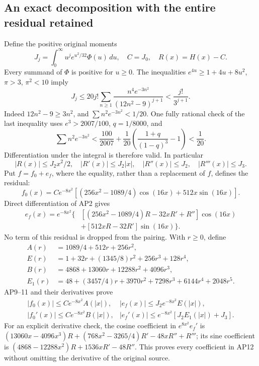 \subsection{An exact decomposition with the entire residual retained}
Define the positive original moments
\[
 J_j=\int_0^\infty u^j e^{u^2/32}\Phi(u)\,du,
 \quad C=J_0,\quad R(x)=H(x)-C.
 \tag{AP7}
\]
Every summand of \(\Phi\) is positive for \(u\ge0\).
The inequalities \(e^{4u}\ge1+4u+8u^2\), \(\pi>3\),
\(\pi^2<10\) imply
\[
 J_j\le20j!\sum_{n\ge1}\frac{n^4e^{-3n^2}}{(12n^2-9)^{j+1}}
 <\frac{j!}{3^{j+1}}.\tag{AP8}
\]
Indeed \(12n^2-9\ge3n^2\), and
\(\sum n^2e^{-3n^2}<1/20\). One fully rational check of the last
inequality uses \(e^3>2007/100\), \(q=1/8000\), and
\[
 \sum n^2e^{-3n^2}<\frac{100}{2007}
 +\frac1{20}\left(\frac{1+q}{(1-q)^3}-1\right)<\frac1{20}.
\]
Differentiation under the integral is therefore valid. In particular
\[
 |R(x)|\le J_2x^2/2,\quad |R'(x)|\le J_2|x|,
 \quad |R''(x)|\le J_2,\quad |R'''(x)|\le J_3.
 \tag{AP9}
\]
Put \(f=f_0+e_f\), where the equality, rather than a replacement
of \(f\), defines the residual:
\[
 f_0(x)=Ce^{-8x^2}[(256x^2-1089/4)\cos(16x)+512x\sin(16x)].
 \tag{AP10}
\]
Direct differentiation of AP2 gives
\[
\begin{split}
 e_f(x)=e^{-8x^2}\{&[(256x^2-1089/4)R-32xR'+R'']\cos(16x)\\
 &+[512xR-32R']\sin(16x)\}.
\end{split}\tag{AP11}
\]
No term of this residual is dropped from the pairing. With \(r\ge0\),
define
\[
\begin{split}
 A(r)&=1089/4+512r+256r^2,\\
 E(r)&=1+32r+(1345/8)r^2+256r^3+128r^4,\\
 B(r)&=4868+13060r+12288r^2+4096r^3,\\
 E_1(r)&=48+(3457/4)r+3970r^2+7298r^3+6144r^4+2048r^5.
\end{split}\tag{AP12}
\]
AP9--11 and their derivatives prove
\[
\begin{array}{ll}
 |f_0(x)|\le Ce^{-8x^2}A(|x|),&
 |e_f(x)|\le J_2e^{-8x^2}E(|x|),\\
 |f_0'(x)|\le Ce^{-8x^2}B(|x|),&
 |e_f'(x)|\le e^{-8x^2}[J_2E_1(|x|)+J_3].
\end{array}\tag{AP13}
\]
For an explicit derivative check, the cosine coefficient in
\(e^{8x^2}e_f'\) is
\((13060x-4096x^3)R+(768x^2-3265/4)R'-48xR''+R'''\);
its sine coefficient is
\((4868-12288x^2)R+1536xR'-48R''\). This proves every coefficient
in AP12 without omitting the derivative of the original source.

